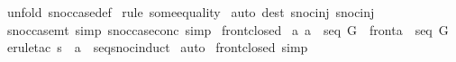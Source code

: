 \begin{isabellebody}
%
\isadelimproof
%
\endisadelimproof
%
\isatagproof
{}\isamarkupfalse%
\ {\isacharparenleft}unfold\ snoc{\isacharunderscore}case{\isacharunderscore}def{\isacharparenright}\isanewline
{}\isamarkupfalse%
\ {\isacharparenleft}rule\ some{\isacharunderscore}equality{\isacharparenright}\isanewline
{}\isamarkupfalse%
\ {\isacharparenleft}auto\ dest{\isacharcolon}\ snoc{\isacharunderscore}inj{}\ snoc{\isacharunderscore}inj{}{\isacharparenright}\isanewline
{}\isamarkupfalse%
%
\endisatagproof
{\isafoldproof}%
%
\isadelimproof
\isanewline
%
\endisadelimproof
\isanewline
{}\isamarkupfalse%
\ snoc{\isacharunderscore}case{\isacharunderscore}mt\ {\isacharbrackleft}simp{\isacharbrackright}\ snoc{\isacharunderscore}case{\isacharunderscore}conc\ {\isacharbrackleft}simp{\isacharbrackright}\isanewline
\isanewline
\isanewline
{}\isamarkupfalse%
\ front{\isacharunderscore}closed{\isacharcolon}\ \isanewline
{\isachardoublequoteopen}{\isacharbang}{\isacharbang}a{\isachardot}\ {\isacharbrackleft}{\isacharbar}a\ {\isacharcolon}\ seq\ G{\isacharbar}{\isacharbrackright}\ {\isacharequal}{\isacharequal}{\isachargreater}\ front{\isacharparenleft}a{\isacharparenright}\ {\isacharcolon}\ seq\ G{\isachardoublequoteclose}\isanewline
%
\isadelimproof
%
\endisadelimproof
%
\isatagproof
{}\isamarkupfalse%
\ {\isacharparenleft}erule{\isacharunderscore}tac\ s\ {\isacharequal}\ {\isachardoublequoteopen}a{\isachardoublequoteclose}\ \ seq{\isacharunderscore}snocinduct{\isacharparenright}\isanewline
{}\isamarkupfalse%
\ auto\isanewline
{}\isamarkupfalse%
%
\endisatagproof
{\isafoldproof}%
%
\isadelimproof
\isanewline
%
\endisadelimproof
{}\isamarkupfalse%
\ front{\isacharunderscore}closed\ {\isacharbrackleft}simp{\isacharbrackright}\isanewline
%
\isadelimtheory
\isanewline
%
\endisadelimtheory
%
\isatagtheory
{}\isamarkupfalse%
%
\endisatagtheory
{\isafoldtheory}%
%
\isadelimtheory
\isanewline
%
\endisadelimtheory
\end{isabellebody}%
